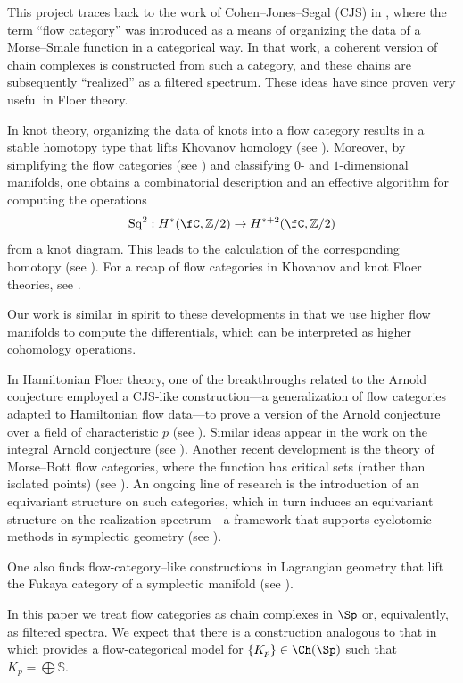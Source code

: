 This project traces back to the work of Cohen–Jones–Segal (CJS) in \cite{CJS95}, where the term “flow category” was introduced as a means of organizing the data of a Morse–Smale function in a categorical way. In that work, a coherent version of chain complexes is constructed from such a category, and these chains are subsequently “realized” as a filtered spectrum. These ideas have since proven very useful in Floer theory.

In knot theory, organizing the data of knots into a flow category results in a stable homotopy type that lifts Khovanov homology (see \cite{LS14}). Moreover, by simplifying the flow categories (see \cite{lobb2018framed, lobb2017calculus}) and classifying $0$- and $1$-dimensional manifolds, one obtains a combinatorial description and an effective algorithm for computing the operations
\[
    \operatorname{Sq}^2 : H^\ast(\fC, \mathbb{Z}/2) \to H^{\ast+2}(\fC, \mathbb{Z}/2)
\]
from a knot diagram. This leads to the calculation of the corresponding homotopy (see \cite{lobb2020khovanov, lipshitz2014steenrod}). For a recap of flow categories in Khovanov and knot Floer theories, see \cite{marengon2024spectra}.

Our work is similar in spirit to these developments in that we use higher flow manifolds to compute the differentials, which can be interpreted as higher cohomology operations.

In Hamiltonian Floer theory, one of the breakthroughs related to the Arnold conjecture employed a CJS-like construction—a generalization of flow categories adapted to Hamiltonian flow data—to prove a version of the Arnold conjecture over a field of characteristic $p$ (see \cite{abouzaid2021arnold}). Similar ideas appear in the work on the integral Arnold conjecture (see \cite{rezchikov2022integral, bai2022arnold}). Another recent development is the theory of Morse–Bott flow categories, where the function has critical sets (rather than isolated points) (see \cite{bonciocat2024revisiting}). An ongoing line of research is the introduction of an equivariant structure on such categories, which in turn induces an equivariant structure on the realization spectrum—a framework that supports cyclotomic methods in symplectic geometry (see \cite{cote2023equivariant, rezchikov2024cyclotomic}).

One also finds flow-category–like constructions in Lagrangian geometry that lift the Fukaya category of a symplectic manifold (see \cite{porcelli2024bordism, porcelli2024spectral}).

\begin{rem}
    In this paper we treat flow categories as chain complexes in $\Sp$ or, equivalently, as filtered spectra. We expect that there is a construction analogous to that in \cite{abouzaid2024foundation} which provides a flow-categorical model for $\{K_p\} \in \Ch(\Sp)$ such that $K_p = \bigoplus \mathbb{S}$.
\end{rem}

